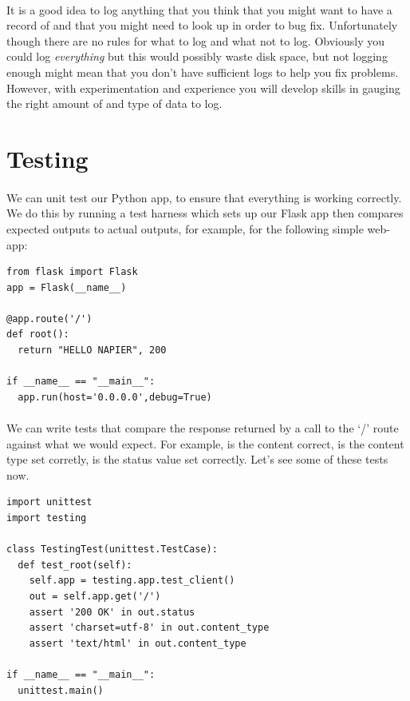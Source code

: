 \documentclass[12pt, a4paper, twoside]{book}
\begin{document}
\paragraph{} It is a good idea to log anything that you think that you might want to have a record of and that you might need to look up in order to bug fix. Unfortunately though there are no rules for what to log and what not to log. Obviously you could log \emph{everything} but this would possibly waste disk space, but not logging enough might mean that you don't have sufficient logs to help you fix problems. However, with experimentation and experience you will develop skills in gauging the right amount of and type of data to log.

\section{Testing}
\label{testing}
\paragraph{} We can unit test our Python app, to ensure that everything is working correctly. We do this by running a test harness which sets up our Flask app then compares expected outputs to actual outputs, for example, for the following simple web-app:

\begin{lstlisting}
from flask import Flask
app = Flask(__name__)

@app.route('/')
def root():
  return "HELLO NAPIER", 200

if __name__ == "__main__":
  app.run(host='0.0.0.0',debug=True)
\end{lstlisting}

\paragraph{} We can write tests that compare the response returned by a call to the `/' route against what we would expect. For example, is the content correct, is the content type set corretly, is the status value set correctly. Let's see some of these tests now.

\begin{lstlisting}
import unittest
import testing

class TestingTest(unittest.TestCase):
  def test_root(self):
    self.app = testing.app.test_client()
    out = self.app.get('/')
    assert '200 OK' in out.status
    assert 'charset=utf-8' in out.content_type
    assert 'text/html' in out.content_type

if __name__ == "__main__":
  unittest.main()
\end{lstlisting}
\end{document}
